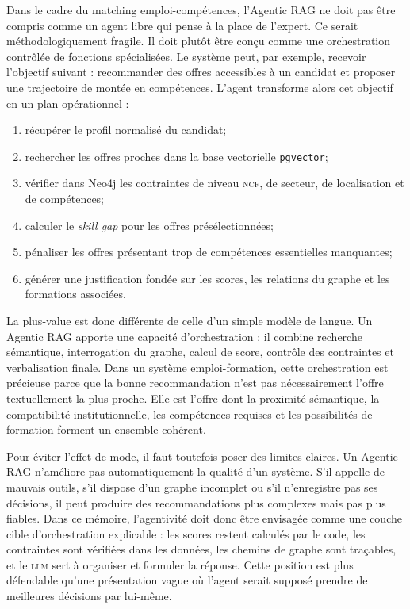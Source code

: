 \documentclass[12pt,twoside]{report}
\newcommand{\NCF}{\textsc{ncf}}
\newcommand{\LLM}{\textsc{llm}}
\begin{document}
Dans le cadre du matching emploi-compétences, l'Agentic RAG ne doit pas être compris comme un agent libre qui \og pense \fg{} à la place de l'expert. Ce serait méthodologiquement fragile. Il doit plutôt être conçu comme une orchestration contrôlée de fonctions spécialisées. Le système peut, par exemple, recevoir l'objectif suivant : recommander des offres accessibles à un candidat et proposer une trajectoire de montée en compétences. L'agent transforme alors cet objectif en un plan opérationnel :

\begin{enumerate}
    \item récupérer le profil normalisé du candidat;
    \item rechercher les offres proches dans la base vectorielle \texttt{pgvector};
    \item vérifier dans Neo4j les contraintes de niveau \NCF{}, de secteur, de localisation et de compétences;
    \item calculer le \emph{skill gap} pour les offres présélectionnées;
    \item pénaliser les offres présentant trop de compétences essentielles manquantes;
    \item générer une justification fondée sur les scores, les relations du graphe et les formations associées.
\end{enumerate}

La plus-value est donc différente de celle d'un simple modèle de langue. Un Agentic RAG apporte une capacité d'orchestration : il combine recherche sémantique, interrogation du graphe, calcul de score, contrôle des contraintes et verbalisation finale. Dans un système emploi-formation, cette orchestration est précieuse parce que la bonne recommandation n'est pas nécessairement l'offre textuellement la plus proche. Elle est l'offre dont la proximité sémantique, la compatibilité institutionnelle, les compétences requises et les possibilités de formation forment un ensemble cohérent.

Pour éviter l'effet de mode, il faut toutefois poser des limites claires. Un Agentic RAG n'améliore pas automatiquement la qualité d'un système. S'il appelle de mauvais outils, s'il dispose d'un graphe incomplet ou s'il n'enregistre pas ses décisions, il peut produire des recommandations plus complexes mais pas plus fiables. Dans ce mémoire, l'agentivité doit donc être envisagée comme une couche cible d'orchestration explicable : les scores restent calculés par le code, les contraintes sont vérifiées dans les données, les chemins de graphe sont traçables, et le \LLM{} sert à organiser et formuler la réponse. Cette position est plus défendable qu'une présentation vague où l'agent serait supposé prendre de meilleures décisions par lui-même.
\end{document}
